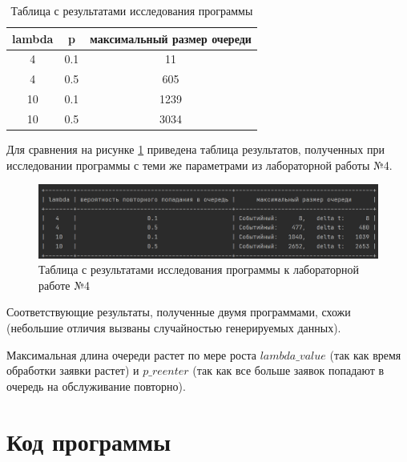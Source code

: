\documentclass[14pt, a4paper]{extarticle}
\begin{document}
\begin{table}[h!]
		\begin{center}
		\captionsetup{justification=raggedleft,singlelinecheck=off}
		\caption{\label{cmp} Таблица с результатами исследования программы}
	\begin{tabular}{|c|c|c|}
		\hline
		lambda & p   & максимальный размер очереди \\ \hline
		4      & 0.1 & 11                          \\ \hline
		4      & 0.5 & 605                         \\ \hline
		10     & 0.1 & 1239                        \\ \hline
		10     & 0.5 & 3034                        \\ \hline
	\end{tabular}
\end{center}
\end{table}

Для сравнения на рисунке \ref{pic:1} приведена таблица результатов, полученных при исследовании программы с теми же параметрами из лабораторной работы №4.



\begin{figure}[h]
	\begin{center}
		{\includegraphics[scale=0.85]{pictures/res_table.png}
			\caption{Таблица с результатами исследования программы к лабораторной работе №4}
			\label{pic:1}}
	\end{center}
\end{figure}

Соответствующие результаты, полученные двумя программами, схожи (небольшие отличия вызваны случайностью генерируемых данных).

Максимальная длина очереди растет по мере роста $lambda\_value$ (так как время обработки заявки растет) и $p\_reenter$ (так как все больше заявок попадают в очередь на обслуживание повторно).

\clearpage
\section{Код программы}
\end{document}
